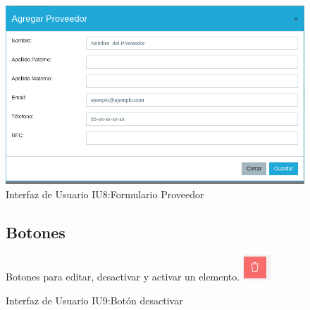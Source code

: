 \begin{figure}[htbp!]
	\begin{center}
\includegraphics[width=\textwidth]{Pantallas/ProveedorFormulario}
		\caption{Interfaz de Usuario IU8:Formulario Proveedor}
	\end{center}
\end{figure}


\begin{figure}[htbp!]
	\begin{center}
	 \subsection{Botones}
	Botones para editar, desactivar y activar un elemento.
\includegraphics[width=\textwidth]{Pantallas/bottonDesactivar}
		\caption{Interfaz de Usuario IU9:Botón desactivar}
	\end{center}
\end{figure}



